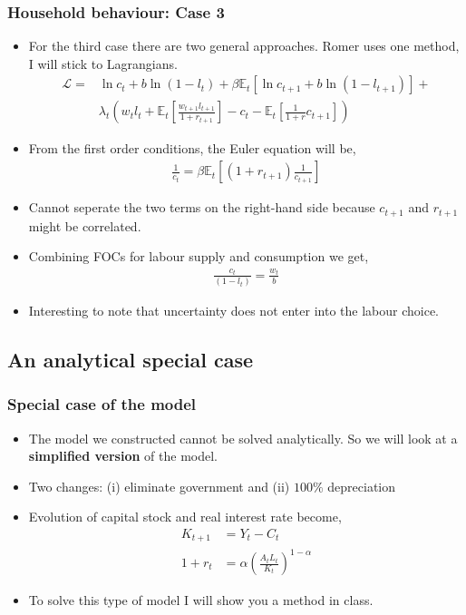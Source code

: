 \documentclass[10pt, handout]{beamer} %
\begin{document}
\begin{frame}
\frametitle{Household behaviour: Case 3}
\small
\begin{itemize}[<+->]
\item For the third case there are two general approaches. Romer uses one method, I will stick to Lagrangians.
\begin{align*}
\mathcal{L} = &\ln{c_{t}} + b\ln(1-l_{t}) + \beta\mathbb{E}_{t}[\ln{c_{t+1}} + b\ln({1 - l_{t+1}})] + \\
& \lambda_{t}\left(w_{t}l_{t} + \mathbb{E}_{t}\left[\frac{w_{t+1}l_{t+1}}{1+r_{t+1}}\right] - c_{t} - \mathbb{E}_{t}\left[\frac{1}{1+r}c_{t+1}\right] \right)
\end{align*}
\item From the first order conditions, the Euler equation will be,
\begin{align*}
\frac{1}{c_{t}} = \beta\mathbb{E}_{t}\left[{(1+r_{t+1})}\frac{1}{c_{t+1}}\right]
\end{align*}
\item Cannot seperate the two terms on the right-hand side because $c_{t+1}$ and $r_{t+1}$ might be correlated.
\item Combining FOCs for labour supply and consumption we get,
\begin{align*}
\frac{c_{t}}{(1-l_{t})} = \frac{w_{t}}{b}
\end{align*}
\item Interesting to note that uncertainty does not enter into the labour choice.
\end{itemize}
\end{frame}

\subsection{An analytical special case}

\begin{frame}
\frametitle{Special case of the model}
\begin{itemize}[<+->]
\item The model we constructed cannot be solved analytically. So we will look at a \textbf{simplified version} of the model.
\item Two changes: (i) eliminate government and (ii) $100\%$ depreciation
\item Evolution of capital stock and real interest rate become,
\begin{align*}
K_{t+1} &= Y_{t} - C_{t} \\
1 + r_{t} &= \alpha\left(\frac{A_{t}L_{t}}{K_{t}}\right)^{1 - \alpha}
\end{align*}
\vspace{2mm}
\item To solve this type of model I will show you a method in class.
\end{itemize}
\end{frame}
\end{document}
